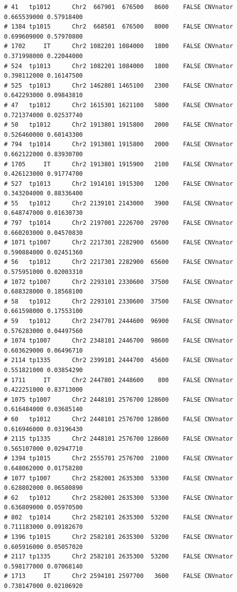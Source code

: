 \documentclass{article}\usepackage[]{graphicx}\usepackage[]{color}
\makeatletter
\newenvironment{kframe}{%
 \def\at@end@of@kframe{}%
 \ifinner\ifhmode%
  \def\at@end@of@kframe{\end{minipage}}%
  \begin{minipage}{\columnwidth}%
 \fi\fi%
 \def\FrameCommand##1{\hskip\@totalleftmargin \hskip-\fboxsep
 \colorbox{shadecolor}{##1}\hskip-\fboxsep
     \hskip-\linewidth \hskip-\@totalleftmargin \hskip\columnwidth}%
 \MakeFramed {\advance\hsize-\width
   \@totalleftmargin\z@ \linewidth\hsize
   \@setminipage}}%
 {\par\unskip\endMakeFramed%
 \at@end@of@kframe}
\newenvironment{knitrout}{}{} %
\makeatother
\begin{document}
\begin{knitrout}
\begin{kframe}
\begin{verbatim}
# 41   tp1012      Chr2  667901  676500   8600    FALSE CNVnator 0.665539000 0.57918400
# 1384 tp1015      Chr2  668501  676500   8000    FALSE CNVnator 0.699609000 0.57970800
# 1702     IT      Chr2 1082201 1084000   1800    FALSE CNVnator 0.371998000 0.22044000
# 524  tp1013      Chr2 1082201 1084000   1800    FALSE CNVnator 0.398112000 0.16147500
# 525  tp1013      Chr2 1462801 1465100   2300    FALSE CNVnator 0.642293000 0.09843810
# 47   tp1012      Chr2 1615301 1621100   5800    FALSE CNVnator 0.721374000 0.02537740
# 50   tp1012      Chr2 1913801 1915800   2000    FALSE CNVnator 0.526460000 0.60143300
# 794  tp1014      Chr2 1913801 1915800   2000    FALSE CNVnator 0.662122000 0.83930700
# 1705     IT      Chr2 1913801 1915900   2100    FALSE CNVnator 0.426123000 0.91774700
# 527  tp1013      Chr2 1914101 1915300   1200    FALSE CNVnator 0.343204000 0.88336400
# 55   tp1012      Chr2 2139101 2143000   3900    FALSE CNVnator 0.648747000 0.01630730
# 797  tp1014      Chr2 2197001 2226700  29700    FALSE CNVnator 0.660203000 0.04570830
# 1071 tp1007      Chr2 2217301 2282900  65600    FALSE CNVnator 0.590884000 0.02451360
# 56   tp1012      Chr2 2217301 2282900  65600    FALSE CNVnator 0.575951000 0.02003310
# 1072 tp1007      Chr2 2293101 2330600  37500    FALSE CNVnator 0.688328000 0.18568100
# 58   tp1012      Chr2 2293101 2330600  37500    FALSE CNVnator 0.661598000 0.17553100
# 59   tp1012      Chr2 2347701 2444600  96900    FALSE CNVnator 0.576283000 0.04497560
# 1074 tp1007      Chr2 2348101 2446700  98600    FALSE CNVnator 0.603629000 0.06496710
# 2114 tp1335      Chr2 2399101 2444700  45600    FALSE CNVnator 0.551821000 0.03854290
# 1711     IT      Chr2 2447801 2448600    800    FALSE CNVnator 0.422251000 0.83713000
# 1075 tp1007      Chr2 2448101 2576700 128600    FALSE CNVnator 0.616484000 0.03685140
# 60   tp1012      Chr2 2448101 2576700 128600    FALSE CNVnator 0.616946000 0.03196430
# 2115 tp1335      Chr2 2448101 2576700 128600    FALSE CNVnator 0.565107000 0.02947710
# 1394 tp1015      Chr2 2555701 2576700  21000    FALSE CNVnator 0.648062000 0.01758280
# 1077 tp1007      Chr2 2582001 2635300  53300    FALSE CNVnator 0.628802000 0.06580890
# 62   tp1012      Chr2 2582001 2635300  53300    FALSE CNVnator 0.636809000 0.05970500
# 802  tp1014      Chr2 2582101 2635300  53200    FALSE CNVnator 0.711183000 0.09182670
# 1396 tp1015      Chr2 2582101 2635300  53200    FALSE CNVnator 0.605916000 0.05057020
# 2117 tp1335      Chr2 2582101 2635300  53200    FALSE CNVnator 0.598177000 0.07068140
# 1713     IT      Chr2 2594101 2597700   3600    FALSE CNVnator 0.738147000 0.02106920

\end{verbatim}
\end{kframe}
\end{knitrout}
\end{document}
